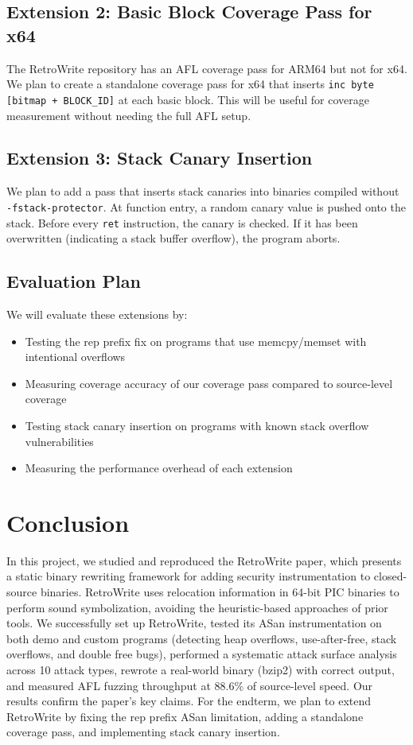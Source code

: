 \documentclass[10pt,a4paper]{article}
\begin{document}
\subsection{Extension 2: Basic Block Coverage Pass for x64}
The RetroWrite repository has an AFL coverage pass for ARM64 but not for x64. We plan to create a standalone coverage pass for x64 that inserts \texttt{inc byte [bitmap + BLOCK\_ID]} at each basic block. This will be useful for coverage measurement without needing the full AFL setup.

\subsection{Extension 3: Stack Canary Insertion}
We plan to add a pass that inserts stack canaries into binaries compiled without \mbox{\texttt{-fstack-protector}}. At function entry, a random canary value is pushed onto the stack. Before every \texttt{ret} instruction, the canary is checked. If it has been overwritten (indicating a stack buffer overflow), the program aborts.

\subsection{Evaluation Plan}
We will evaluate these extensions by:
\begin{itemize}
    \item Testing the rep prefix fix on programs that use memcpy/memset with intentional overflows
    \item Measuring coverage accuracy of our coverage pass compared to source-level coverage
    \item Testing stack canary insertion on programs with known stack overflow vulnerabilities
    \item Measuring the performance overhead of each extension
\end{itemize}

\section{Conclusion}

In this project, we studied and reproduced the RetroWrite paper, which presents a static binary rewriting framework for adding security instrumentation to closed-source binaries. RetroWrite uses relocation information in 64-bit PIC binaries to perform sound symbolization, avoiding the heuristic-based approaches of prior tools. We successfully set up RetroWrite, tested its ASan instrumentation on both demo and custom programs (detecting heap overflows, use-after-free, stack overflows, and double free bugs), performed a systematic attack surface analysis across 10 attack types, rewrote a real-world binary (bzip2) with correct output, and measured AFL fuzzing throughput at 88.6\% of source-level speed. Our results confirm the paper's key claims. For the endterm, we plan to extend RetroWrite by fixing the rep prefix ASan limitation, adding a standalone coverage pass, and implementing stack canary insertion.
\end{document}
